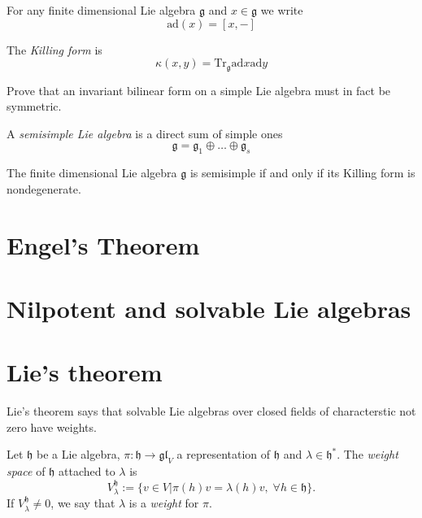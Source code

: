 \begin{definition}
\label{definition-ad}
For any finite dimensional Lie algebra  $\mathfrak{g}$ and $x \in \mathfrak{g}$
we write
$$
\text{ad}(x)=[x,-]
$$
\end{definition}

\begin{definition}
\label{definition-Killing-form}
The {\it Killing form} is
$$
\kappa(x,y)=\text{Tr}_{\mathfrak{g}}\text{ad}x\text{ad}y
$$
\end{definition}

\begin{exercise}
\label{exercise-invariant-bilinear-form-on-simple-Lie-algebra-is-symmetric}
Prove that an invariant bilinear form on a simple Lie algebra must in fact be
symmetric.
\end{exercise}

\begin{definition}
\label{definition-semisimple-Lie-algebra}
A {\it semisimple Lie algebra} is a direct sum of simple ones
$$
\mathfrak{g}=\mathfrak{g}_1\oplus\ldots\oplus\mathfrak{g}_s
$$
\end{definition}

\begin{theorem}[Cartan]
\label{theorem-Cartan}
The finite dimensional Lie algebra $\mathfrak{g}$ is semisimple if and only if
its Killing form is nondegenerate.
\end{theorem}

\section{Engel's Theorem}
\label{section-Engel-theorem}

\section{Nilpotent and solvable Lie algebras}
\label{section-nilpotent-and-solvable-Lie-algebras}

\section{Lie's theorem}
\label{section-Lie-theorem}

Lie's theorem says that solvable Lie algebras over closed fields of
characterstic not zero have weights.

\begin{definition}
\label{definition-weight-space}
Let $\mathfrak{h}$ be a Lie algebra, 
$\pi:\mathfrak{h}\to\mathfrak{gl}_V$ a representation of $\mathfrak{h}$ 
and $\lambda \in \mathfrak{h}^*$. The {\it weight space} of $\mathfrak{h}$
attached to $\lambda$ is
$$
V_\lambda^{\mathfrak{h}}:=\{v \in V|\pi(h)v=\lambda(h)v,\; 
\forall h \in \mathfrak{h}\}.
$$
If $V_\lambda^{\mathfrak{h}}\neq 0$, we say that $\lambda$ is a {\it weight} for
$\pi$.
\end{definition}

